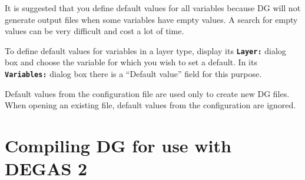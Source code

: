 \documentclass[12pt]{report}
\begin{document}
It is suggested that you define default values for all variables
because DG will not generate output files when some variables have
empty values. A search for empty values can be very difficult and cost
a lot of time.


To define default values for variables in a layer type, display its
\textbf{\texttt{Layer:}} dialog box and
choose the variable for which you wish to set a default.
In its \textbf{\texttt{Variables:}} dialog box there is a
``Default value'' field for this purpose.

Default values from the configuration file are used only to create new
DG files. When opening an existing file, default values from the
configuration are ignored.

\section{Compiling DG for use with DEGAS 2}
\label{dgcompile}
\end{document}
